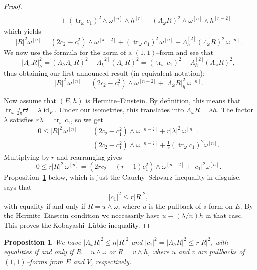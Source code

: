 \documentclass[11pt,a4paper]{amsart}
\def\wp#1{\omega^{[#1]}}
\def\hp#1{h^{[#1]}}
\def\Lp#1{\Lambda^{[#1]}}
\DeclareMathOperator{\tr}{tr}
\DeclareMathOperator{\id}{id}
\def\skrun{\frac{i}{2\pi} \Theta}
\newtheorem{prop}[theo]{Proposition}
\theoremstyle{definition}
\numberwithin{equation}{section}
\begin{document}
\begin{proof}
\begin{align*}
    \\
    &\qquad\qquad
    + (\tr_\omega c_1)^2 \wedge \wp{n} \wedge \hp{r}
    - (\Lambda_\omega R)^2 \wedge \wp{n} \wedge \hp{r-2}
\end{align*}
which yields
$$
    \lvert R \rvert^2 \wp{n}
    = (2 c_2 - c_1^2) \wedge \wp{n-2}
    + (\tr_\omega c_1)^2 \, \wp{n}
    - \Lp{2}_h(\Lambda_\omega R)^2 \, \wp{n}.
$$
We now use the formula for the norm of a $(1,1)$--form and see that
$$
\lvert \Lambda_\omega R \rvert_h^2
= (\Lambda_h\Lambda_\omega R)^2 - \Lp{2}_h(\Lambda_\omega R)^2
= (\tr_\omega c_1)^2 - \Lp{2}_h(\Lambda_\omega R)^2,
$$
thus obtaining our first announced result (in equivalent notation):
$$
    \lvert R \rvert^2 \, \wp{n}
    = (2 c_2 - c_1^2) \wedge \wp{n-2}
    + \lvert \Lambda_\omega R \rvert_h^2 \, \wp{n}.
$$

Now assume that $(E,h)$ is Hermite--Einstein. By definition, this means
that $\tr_\omega \skrun = \lambda \id_{E}$. Under our isometries, this
translates into $\Lambda_\omega R = \lambda h$. The factor $\lambda$
satisfies $r \lambda = \tr_\omega c_1$, so we get
\begin{align*}
    0 \leq 
    \lvert R \rvert^2 \, \wp{n}
    &= (2 c_2 - c_1^2) \wedge \wp{n-2}
    + r |\lambda|^2 \, \wp{n}.
    \\
    &= (2 c_2 - c_1^2) \wedge \wp{n-2}
    + \tfrac 1r (\tr_\omega c_1)^2 \wp{n}.
\end{align*}
Multiplying by $r$ and rearranging gives 
$$
0 \leq
r \lvert R \rvert^2 \, \wp{n}
= (2r c_2 - (r-1)c_1^2) \wedge \wp{n-2}
+ \lvert c_1 \rvert^2 \wp{n}.
$$
Proposition~\ref{prop:CS} below, which is just the Cauchy--Schwarz
inequality in disguise, says that
$$
\lvert c_1 \rvert^2 \leq r \lvert R \rvert^2,
$$
with equality if and only if $R = u \wedge \omega$, where $u$ is the
pullback of a form on $E$. By the Hermite--Einstein condition we
necessarily have $u = (\lambda/n) h$ in that case. This proves the
Kobayashi--L\"{u}bke inequality.
\end{proof}



\begin{prop}
\label{prop:CS}
We have $\lvert \Lambda_\omega R\rvert^2 \leq n \lvert R \rvert^2$ and
$\lvert c_1 \rvert^2 = \lvert \Lambda_h R\rvert^2 \leq r \lvert R
\rvert^2$, with equalities if and only if $R = u \wedge \omega$ or $R = v
\wedge h$, where $u$ and $v$ are pullbacks of $(1,1)$--forms from $E$ and
$V$, respectively. 
\end{prop}
\end{document}
